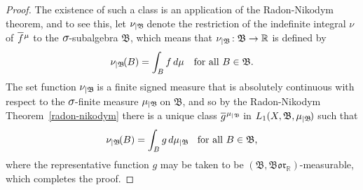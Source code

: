 \documentclass[
twoside=true,
paper=letter,
fontsize=9pt,
pagesize=auto,
leqno,
openany,
headsepline,
overfullrule,
]{scrbook}
\theoremstyle{plain}
\theoremstyle{plain}
\theoremstyle{definition}
\theoremstyle{bfnoteitalic}
\theoremstyle{bfnoteroman}
\newcommand{\sigalg}[1]{\mathfrak{#1}}
\newcommand{\borel}{\mathfrak{Bor}}
\newcommand{\textsigma}{\hbox{\large{$\sigma$}}\kern-1pt}
\newcommand{\restrictedto}[1]{_{\lvert#1}\kern-1.5pt}
\newcommand{\R}{\mathbb{R}}
\newcommand{\sigmaalgebraii}{\sigalg{B}}
\newcommand{\function}{f}
\newcommand{\functionii}{g}
\newcommand{\measurespace}{X}
\newcommand{\measure}{\mu}
\newcommand{\measureii}{\nu}
\newcommand*\xbar[1]{%
   \hbox{%
     \vbox{%
       \hrule height 0.4pt %
       \kern0.4ex%
       \hbox{%
         \ensuremath{#1}%
       }%
     }%
   }%
}
\newcommand{\lebclass}[1]{\hspace{.5pt}\xbar{#1}\hspace{0.5pt}}
\newcommand{\ellclass}[2]{\lebclass{#1}^{#2}}
\begin{document}
\begin{proof}
The existence of such a  class is an application of the Radon-Nikodym theorem, and to see this, let $\measureii\restrictedto{\sigmaalgebraii}$ denote the restriction of the indefinite integral $\measureii$ of $\ellclass{\function}{\measure}$ to the $\textsigma$-subalgebra $\sigmaalgebraii$, which means that $\measureii\restrictedto{\sigmaalgebraii} :\sigmaalgebraii\to\R$ is defined by
\[
\measureii\restrictedto{\sigmaalgebraii}(B) 
=
\int_B \function\, d\measure
\quad\text{for all $B\in\sigmaalgebraii$.}
\]
The set function $\measureii\restrictedto{\sigmaalgebraii}$ is a finite signed measure that is absolutely continuous with respect to the $\textsigma$-finite measure $\measure\restrictedto{\sigmaalgebraii}$ on $\sigmaalgebraii$, and so by the Radon-Nikodym Theorem~\ref{radon-nikodym} there is a unique class
$\ellclass{\functionii}{\measure\restrictedto{\sigmaalgebraii}}$ in $L_1(\measurespace, \sigmaalgebraii,\measure\restrictedto{\sigmaalgebraii})$
such that
\[
\measureii\restrictedto{\sigmaalgebraii}(B) 
= 
\int_B \functionii \, d\measure\restrictedto{\sigmaalgebraii}
\quad\text{for all $B\in\sigmaalgebraii$,}
\]
where the representative function $\functionii$ may be taken to be $(\sigmaalgebraii, \borel_\R)$\hyp{}measurable,
which completes the proof.
\end{proof}  
\end{document}
